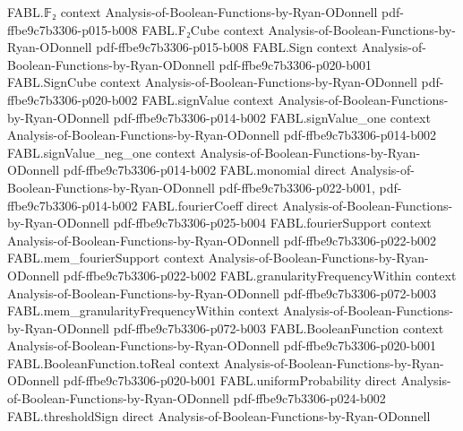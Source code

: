 \begin{theorem}
\label{FABL.totalInfluence_orFunction}
\leanok
{}
\proofstep
  {FABL.𝔽₂}
  {context}
  {Analysis-of-Boolean-Functions-by-Ryan-ODonnell}
  {pdf-ffbe9c7b3306-p015-b008}
\proofstep
  {FABL.F₂Cube}
  {context}
  {Analysis-of-Boolean-Functions-by-Ryan-ODonnell}
  {pdf-ffbe9c7b3306-p015-b008}
\proofstep
  {FABL.Sign}
  {context}
  {Analysis-of-Boolean-Functions-by-Ryan-ODonnell}
  {pdf-ffbe9c7b3306-p020-b001}
\proofstep
  {FABL.SignCube}
  {context}
  {Analysis-of-Boolean-Functions-by-Ryan-ODonnell}
  {pdf-ffbe9c7b3306-p020-b002}
\proofstep
  {FABL.signValue}
  {context}
  {Analysis-of-Boolean-Functions-by-Ryan-ODonnell}
  {pdf-ffbe9c7b3306-p014-b002}
\proofstep
  {FABL.signValue_one}
  {context}
  {Analysis-of-Boolean-Functions-by-Ryan-ODonnell}
  {pdf-ffbe9c7b3306-p014-b002}
\proofstep
  {FABL.signValue_neg_one}
  {context}
  {Analysis-of-Boolean-Functions-by-Ryan-ODonnell}
  {pdf-ffbe9c7b3306-p014-b002}
\proofstep
  {FABL.monomial}
  {direct}
  {Analysis-of-Boolean-Functions-by-Ryan-ODonnell}
  {pdf-ffbe9c7b3306-p022-b001,
    pdf-ffbe9c7b3306-p014-b002}
\proofstep
  {FABL.fourierCoeff}
  {direct}
  {Analysis-of-Boolean-Functions-by-Ryan-ODonnell}
  {pdf-ffbe9c7b3306-p025-b004}
\proofstep
  {FABL.fourierSupport}
  {context}
  {Analysis-of-Boolean-Functions-by-Ryan-ODonnell}
  {pdf-ffbe9c7b3306-p022-b002}
\proofstep
  {FABL.mem_fourierSupport}
  {context}
  {Analysis-of-Boolean-Functions-by-Ryan-ODonnell}
  {pdf-ffbe9c7b3306-p022-b002}
\proofstep
  {FABL.granularityFrequencyWithin}
  {context}
  {Analysis-of-Boolean-Functions-by-Ryan-ODonnell}
  {pdf-ffbe9c7b3306-p072-b003}
\proofstep
  {FABL.mem_granularityFrequencyWithin}
  {context}
  {Analysis-of-Boolean-Functions-by-Ryan-ODonnell}
  {pdf-ffbe9c7b3306-p072-b003}
\proofstep
  {FABL.BooleanFunction}
  {context}
  {Analysis-of-Boolean-Functions-by-Ryan-ODonnell}
  {pdf-ffbe9c7b3306-p020-b001}
\proofstep
  {FABL.BooleanFunction.toReal}
  {context}
  {Analysis-of-Boolean-Functions-by-Ryan-ODonnell}
  {pdf-ffbe9c7b3306-p020-b001}
\proofstep
  {FABL.uniformProbability}
  {direct}
  {Analysis-of-Boolean-Functions-by-Ryan-ODonnell}
  {pdf-ffbe9c7b3306-p024-b002}
\proofstep
  {FABL.thresholdSign}
  {direct}
  {Analysis-of-Boolean-Functions-by-Ryan-ODonnell}

\end{theorem}
